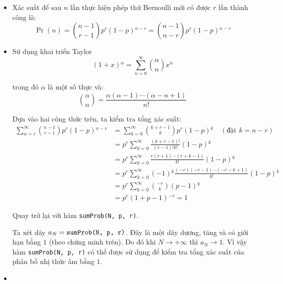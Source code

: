 \documentclass{article}
\begin{document}
\begin{itemize}
    \item Xác suất để sau $n$ lần thực hiện phép thử Bernoulli mới có được $r$ lần thành công là:
        \[ \Pr(n) = \binom{n - 1}{r - 1}p^{r}(1 - p){}^{n - r} = \binom{n - 1}{n - r}p^{r}(1 - p){}^{n - r} \]
    \item Sử dụng khai triển Taylor
        \[ (1 + x){}^{\alpha} = \sum^{\infty}_{n=0}\binom{\alpha}{n}x^{n}  \]
        \par trong đó $\alpha$ là một số thực và:
        \[ \binom{\alpha}{n} = \frac{\alpha(\alpha - 1)\cdots (\alpha - n + 1)}{n!} \]
        \par Dựa vào hai công thức trên, ta kiểm tra tổng xác suất:
        \begin{align*}
            \sum^{\infty}_{n=r}\binom{n-1}{r-1}p^{r}(1-p){}^{n-r} &= \sum^{\infty}_{k=0}\binom{k + r - 1}{k}p^{r}(1-p){}^{k}\quad(\text{đặt }k = n - r) \\
                                                                &= p^{r}\sum^{\infty}_{k=0}\frac{(k + r - 1)!}{(r - 1)!k!}(1 - p){}^{k} \\
                                                                &= p^{r}\sum^{\infty}_{k=0}\frac{r(r+1)\cdots (r + k - 1)}{k!}(1-p){}^{k} \\
                                                                &= p^{r}\sum^{\infty}_{k=0}(-1){}^{k}\frac{(-r)(-r - 1)\cdots (-r -k + 1)}{k!}(1-p){}^{k} \\
                                                                &= p^{r}\sum^{\infty}_{k=0}\binom{-r}{k}(p-1){}^{k} \\
                                                                &= p^{r}(1 + p - 1){}^{-r} = 1
        \end{align*}
        \par Quay trở lại với hàm \texttt{sumProb(N, p, r)}.
        \par Ta xét dãy $a_{N} = \text{\texttt{sumProb(N, p, r)}}$. Đây là một dãy dương, tăng và có giới hạn bằng $1$ (theo chứng minh trên). Do đó khi $N\to{+\infty}$ thì $a_{N}\to 1$. Vì vậy hàm \texttt{sumProb(N, p, r)} có thể được sử dụng để kiểm tra tổng xác suất của phân bố nhị thức âm bằng $1$.
    \item $ $
\end{itemize}
\end{document}
